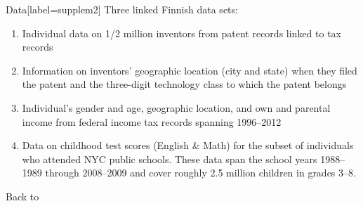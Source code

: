 \begin{frame}{Data}[label=supplem2]
  Three linked Finnish data sets: \\
\begin{enumerate}
\item Individual data on 1/2 million inventors from patent records linked to tax records
  \item  Information on inventors’ geographic location (city and state) when they
filed the patent and the three-digit technology class to which the
patent belongs
\item Individual’s gender and age, geographic location, and own and parental income from federal income tax records spanning 1996–2012
  \item Data on childhood test scores (English \& Math) for the subset of individuals who attended
NYC public schools. These data span the school years 1988–1989 through 2008–2009 and cover roughly 2.5 million children in grades 3–8.
\end{enumerate}

Back to \hyperlink{main}{}
\end{frame}


